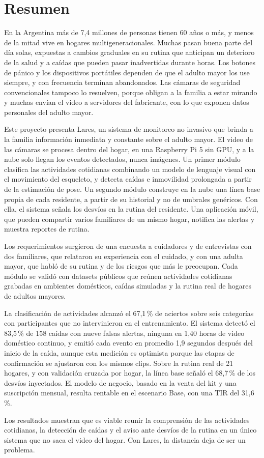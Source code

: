 \chapter*{Resumen}

En la Argentina más de 7,4 millones de personas tienen 60 años o más, y menos de la mitad vive en hogares multigeneracionales.
Muchas pasan buena parte del día solas, expuestas a cambios graduales en su rutina que anticipan un deterioro de la salud y a caídas que pueden pasar inadvertidas durante horas.
Los botones de pánico y los dispositivos portátiles dependen de que el adulto mayor los use siempre, y con frecuencia terminan abandonados.
Las cámaras de seguridad convencionales tampoco lo resuelven, porque obligan a la familia a estar mirando y muchas envían el video a servidores del fabricante, con lo que exponen datos personales del adulto mayor.

Este proyecto presenta Lares, un sistema de monitoreo no invasivo que brinda a la familia información inmediata y constante sobre el adulto mayor.
El video de las cámaras se procesa dentro del hogar, en una Raspberry Pi 5 sin GPU, y a la nube solo llegan los eventos detectados, nunca imágenes.
Un primer módulo clasifica las actividades cotidianas combinando un modelo de lenguaje visual con el movimiento del esqueleto, y detecta caídas e inmovilidad prolongada a partir de la estimación de pose.
Un segundo módulo construye en la nube una línea base propia de cada residente, a partir de su historial y no de umbrales genéricos.
Con ella, el sistema señala los desvíos en la rutina del residente.
Una aplicación móvil, que pueden compartir varios familiares de un mismo hogar, notifica las alertas y muestra reportes de rutina.

Los requerimientos surgieron de una encuesta a cuidadores y de entrevistas con dos familiares, que relataron su experiencia con el cuidado, y con una adulta mayor, que habló de su rutina y de los riesgos que más le preocupan.
Cada módulo se validó con datasets públicos que reúnen actividades cotidianas grabadas en ambientes domésticos, caídas simuladas y la rutina real de hogares de adultos mayores.

La clasificación de actividades alcanzó el 67,1\,\% de aciertos sobre seis categorías con participantes que no intervinieron en el entrenamiento.
El sistema detectó el 83,5\,\% de 158 caídas con nueve falsas alertas, ninguna en 1,40 horas de video doméstico continuo, y emitió cada evento en promedio 1,9 segundos después del inicio de la caída, aunque esta medición es optimista porque las etapas de confirmación se ajustaron con los mismos clips.
Sobre la rutina real de 21 hogares, y con validación cruzada por hogar, la línea base señaló el 68,7\,\% de los desvíos inyectados.
El modelo de negocio, basado en la venta del kit y una suscripción mensual, resulta rentable en el escenario Base, con una TIR del 31,6\,\%.

Los resultados muestran que es viable reunir la comprensión de las actividades cotidianas, la detección de caídas y el aviso ante desvíos de la rutina en un único sistema que no saca el video del hogar.
Con Lares, la distancia deja de ser un problema.

